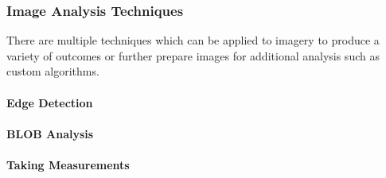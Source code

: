 \subsubsection{Image Analysis Techniques}
	There are multiple techniques which can be applied to imagery to produce a variety of outcomes or further prepare images for additional analysis such as custom algorithms. 
	\paragraph{Edge Detection}
	\paragraph{BLOB Analysis}
	\paragraph{Taking Measurements}